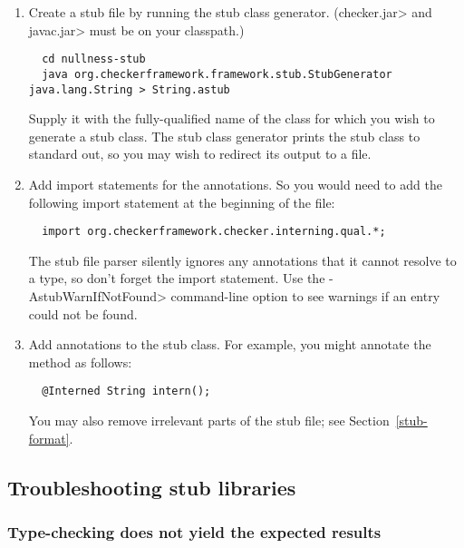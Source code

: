 \begin{enumerate}

\item
  Create a stub file by running the stub class generator.  (\<checker.jar> and \<javac.jar>
  must be on your classpath.)

\begin{Verbatim}
  cd nullness-stub
  java org.checkerframework.framework.stub.StubGenerator java.lang.String > String.astub
\end{Verbatim}

  Supply it with the fully-qualified name of the class for which you wish to
  generate a stub class.  The stub class generator prints the
  stub class to standard out, so you may wish to redirect its output to a
  file.

\item
  Add import statements for the annotations.  So you would need to
add the following import statement at the beginning of the file:

\begin{Verbatim}
  import org.checkerframework.checker.interning.qual.*;
\end{Verbatim}

\noindent
The stub file parser silently ignores any annotations that it cannot
resolve to a type, so don't forget the import statement.
Use the \<-AstubWarnIfNotFound> command-line option to see warnings
if an entry could not be found.

\item
  Add annotations to the stub class.  For example, you might annotate
  the  method as follows:

\begin{Verbatim}
  @Interned String intern();
\end{Verbatim}

  You may also remove irrelevant parts of the stub file; see
  Section~\ref{stub-format}.

\end{enumerate}


\subsection{Troubleshooting stub libraries\label{stub-troubleshooting}}


\subsubsection{Type-checking does not yield the expected results}

